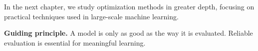 \medskip

In the next chapter, we study optimization methods in greater depth, focusing on practical techniques used in large-scale machine learning.

\medskip

\noindent
\textbf{Guiding principle.}  
A model is only as good as the way it is evaluated. Reliable evaluation is essential for meaningful learning.